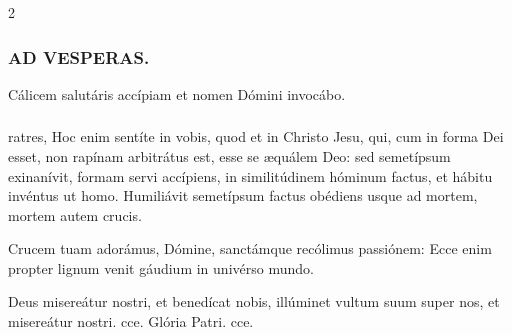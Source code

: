 \documentclass[9pt,twoside]{extarticle}
\begin{document}
\begin{multicols}{2}
\subsubsection*{\center \textsc{AD VESPERAS.}}
\begin{tightlist}{}
\item {} Cálicem salutáris accípiam et nomen Dómini invocábo.
\item {}
\end{tightlist}
\subsubsection*{}
ratres, Hoc enim sentíte in vobis, quod et in Christo Jesu, qui, cum in forma Dei esset, non rapínam arbitrátus est, esse se æquálem Deo: sed semetípsum exinanívit, formam servi accípiens, in similitúdinem hóminum factus, et hábitu invéntus ut homo. Humiliávit semetípsum factus obédiens usque ad mortem, mortem autem crucis.

\begin{tightlist}{}
\item {} Crucem tuam adorámus, Dómine, sanctámque recólimus passiónem: \textred{*} Ecce enim propter lignum venit gáudium in univérso mundo. 
\item {} Deus misereátur nostri, et benedícat nobis, illúminet vultum suum super nos, et misereátur nostri. cce. Glória Patri. cce.
\end{tightlist}

\end{multicols}
\end{document}
